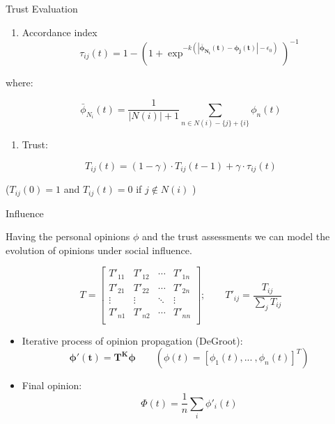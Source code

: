 \begin{frame}{Trust Evaluation}

\begin{enumerate}
\def\labelenumi{\arabic{enumi}.}
\tightlist
\item
  Accordance index \[
  \tau_{ij}(t) = 1 - (1 + \exp^{-k(|\boldsymbol{\bar\phi_{N_i}(t) - \phi_j(t)} | - \epsilon_0)})^{-1}
  \]
\end{enumerate}

where:

\[
\bar\phi_{N_i}(t) = \frac{1}{|N(i)|+1} \sum_{n \in N(i)-\{j\}+\{i\}} \phi_n(t)
\]

\begin{enumerate}
\def\labelenumi{\arabic{enumi}.}
\setcounter{enumi}{1}
\tightlist
\item
  Trust:
\end{enumerate}

\[
T_{ij}(t) = (1 - \gamma) \cdot T_{ij} \left ( t-1 \right ) +  \gamma \cdot \tau_{ij}(t)
\]

(\(T_{ij}(0) = 1\) and \(T_{ij}(t) = 0\) if \(j \not\in N(i)\) )

\end{frame}

\begin{frame}{Influence}

Having the personal opinions \(\phi\) and the trust assessments we can
model the evolution of opinions under social influence.

\[T =
 \begin{bmatrix}
  T'_{11} & T'_{12} & \cdots & T'_{1n} \\
  T'_{21} & T'_{22} & \cdots & T'_{2n} \\
  \vdots  & \vdots  & \ddots & \vdots  \\
  T'_{n1} & T'_{n2} & \cdots & T'_{nn} \\
 \end{bmatrix}; \qquad T'_{ij} = \frac{T_{ij}}{\sum_j T_{ij}}
 \]

\begin{itemize}
\item
  Iterative process of opinion propagation (DeGroot):
  \[\boldsymbol{\phi'(t) = T^{K}\phi} \qquad  (\phi(t) = [\phi_{1}(t), ...~, \phi_{n}(t)]^T)\]
\item
  Final opinion: \[\Phi(t) = \frac{1}{n}\sum_i \phi'_i(t)\]
\end{itemize}

\end{frame}

